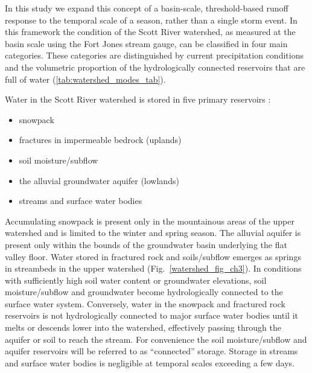 \documentclass[hess, manuscript]{copernicus}
\providecommand{\tightlist}{%
  \setlength{\itemsep}{0pt}\setlength{\parskip}{0pt}}
\begin{document}
In this study we expand this concept of a basin-scale, threshold-based
runoff response to the temporal scale of a season, rather than a single
storm event. In this framework the condition of the Scott River
watershed, as measured at the basin scale using the Fort Jones stream
gauge, can be classified in four main categories. These categories are
distinguished by current precipitation conditions and the volumetric
proportion of the hydrologically connected reservoirs that are full of
water (\autoref{tab:watershed_modes_tab}).

Water in the Scott River watershed is stored in five primary reservoirs
\citep{Harter2008}:

\begin{itemize}
\tightlist
\item
  snowpack
\item
  fractures in impermeable bedrock (uplands)
\item
  soil moisture/subflow
\item
  the alluvial groundwater aquifer (lowlands)
\item
  streams and surface water bodies
\end{itemize}

Accumulating snowpack is present only in the mountainous areas of the
upper watershed and is limited to the winter and spring season. The
alluvial aquifer is present only within the bounds of the groundwater
basin underlying the flat valley floor. Water stored in fractured rock
and soils/subflow emerges as springs in streambeds in the upper
watershed \citep{Mack1958} (Fig.~\ref{watershed_fig_ch3}). In
conditions with sufficiently high soil water content or groundwater
elevations, soil moisture/subflow and groundwater become hydrologically
connected to the surface water system. Conversely, water in the snowpack
and fractured rock reservoirs is not hydrologically connected to major
surface water bodies until it melts or descends lower into the
watershed, effectively passing through the aquifer or soil to reach the
stream. For convenience the soil moisture/subflow and aquifer reservoirs
will be referred to as ``connected'' storage. Storage in streams and
surface water bodies is negligible at temporal scales exceeding a few
days.
\end{document}
